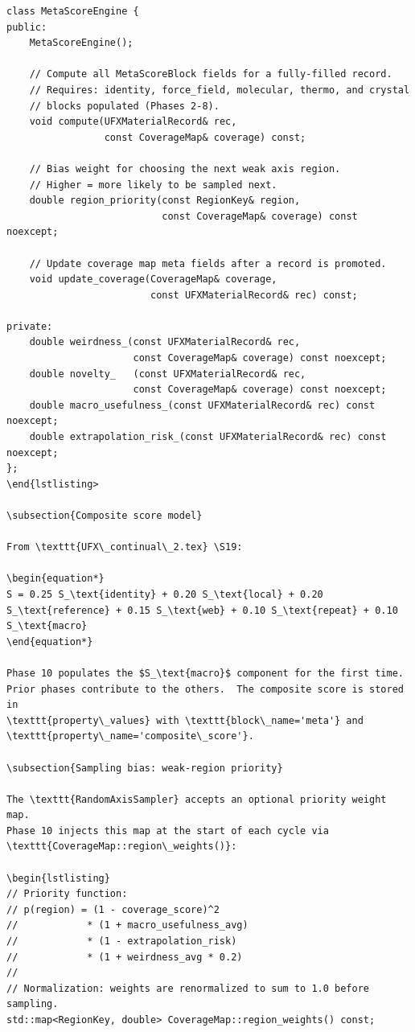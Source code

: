 \documentclass[11pt, a4paper]{article}
\begin{document}
\begin{lstlisting}
class MetaScoreEngine {
public:
	MetaScoreEngine();

	// Compute all MetaScoreBlock fields for a fully-filled record.
	// Requires: identity, force_field, molecular, thermo, and crystal
	// blocks populated (Phases 2-8).
	void compute(UFXMaterialRecord& rec,
				 const CoverageMap& coverage) const;

	// Bias weight for choosing the next weak axis region.
	// Higher = more likely to be sampled next.
	double region_priority(const RegionKey& region,
						   const CoverageMap& coverage) const noexcept;

	// Update coverage map meta fields after a record is promoted.
	void update_coverage(CoverageMap& coverage,
						 const UFXMaterialRecord& rec) const;

private:
	double weirdness_(const UFXMaterialRecord& rec,
					  const CoverageMap& coverage) const noexcept;
	double novelty_   (const UFXMaterialRecord& rec,
					  const CoverageMap& coverage) const noexcept;
	double macro_usefulness_(const UFXMaterialRecord& rec) const noexcept;
	double extrapolation_risk_(const UFXMaterialRecord& rec) const noexcept;
};
\end{lstlisting>

\subsection{Composite score model}

From \texttt{UFX\_continual\_2.tex} \S19:

\begin{equation*}
S = 0.25 S_\text{identity} + 0.20 S_\text{local} + 0.20 S_\text{reference} + 0.15 S_\text{web} + 0.10 S_\text{repeat} + 0.10 S_\text{macro}
\end{equation*}

Phase 10 populates the $S_\text{macro}$ component for the first time.
Prior phases contribute to the others.  The composite score is stored in
\texttt{property\_values} with \texttt{block\_name='meta'} and
\texttt{property\_name='composite\_score'}.

\subsection{Sampling bias: weak-region priority}

The \texttt{RandomAxisSampler} accepts an optional priority weight map.
Phase 10 injects this map at the start of each cycle via
\texttt{CoverageMap::region\_weights()}:

\begin{lstlisting}
// Priority function:
// p(region) = (1 - coverage_score)^2
//            * (1 + macro_usefulness_avg)
//            * (1 - extrapolation_risk)
//            * (1 + weirdness_avg * 0.2)
//
// Normalization: weights are renormalized to sum to 1.0 before sampling.
std::map<RegionKey, double> CoverageMap::region_weights() const;
\end{lstlisting}
\end{document}
